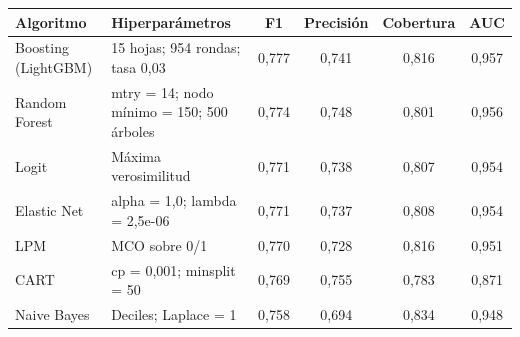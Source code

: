 \begin{tabular}{llcccc}
\toprule
\textbf{Algoritmo} & \textbf{Hiperparámetros} & \textbf{F1} & \textbf{Precisión} & \textbf{Cobertura} & \textbf{AUC} \\
\midrule
Boosting (LightGBM) & 15 hojas; 954 rondas; tasa 0,03 & 0,777 & 0,741 & 0,816 & 0,957 \\
Random Forest & mtry = 14; nodo mínimo = 150; 500 árboles & 0,774 & 0,748 & 0,801 & 0,956 \\
Logit & Máxima verosimilitud & 0,771 & 0,738 & 0,807 & 0,954 \\
Elastic Net & alpha = 1,0; lambda = 2,5e-06 & 0,771 & 0,737 & 0,808 & 0,954 \\
LPM & MCO sobre 0/1 & 0,770 & 0,728 & 0,816 & 0,951 \\
CART & cp = 0,001; minsplit = 50 & 0,769 & 0,755 & 0,783 & 0,871 \\
Naive Bayes & Deciles; Laplace = 1 & 0,758 & 0,694 & 0,834 & 0,948 \\
\bottomrule
\end{tabular}

